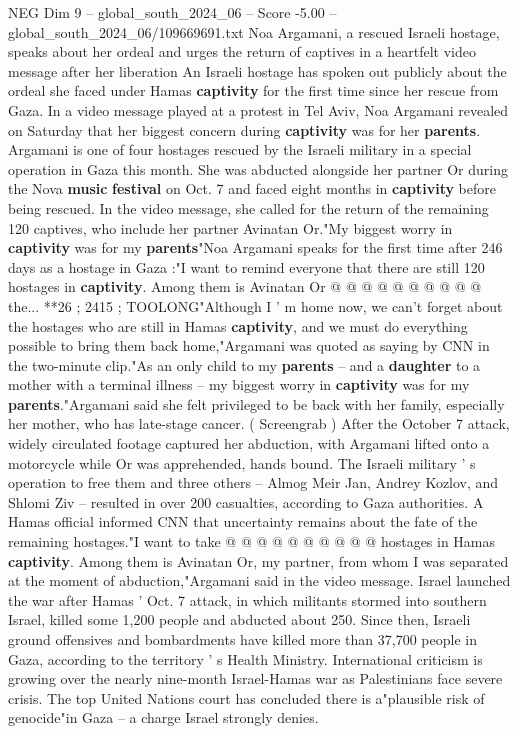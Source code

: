 \begin{textsample}{NEG Dim 9 – global\_south\_2024\_06 – Score -5.00 – global\_south\_2024\_06/109669691.txt}  \label{ex:f9_neg_355}
Noa Argamani, a rescued Israeli hostage, speaks about her ordeal and urges the return of captives in a heartfelt video message after her liberation An Israeli hostage has spoken out publicly about the ordeal she faced under Hamas \textbf{captivity} for the first time since her rescue from Gaza.
In a video message played at a protest in Tel Aviv, Noa Argamani revealed on Saturday that her biggest concern during \textbf{captivity} was for her \textbf{parents}.
Argamani is one of four hostages rescued by the Israeli military in a special operation in Gaza this month.
She was abducted alongside her partner Or during the Nova \textbf{music} \textbf{festival} on Oct. 7 and faced eight months in \textbf{captivity} before being rescued.
In the video message, she called for the return of the remaining 120 captives, who include her partner Avinatan Or."My biggest worry in \textbf{captivity} was for my \textbf{parents}"Noa Argamani speaks for the first time after 246 days as a hostage in Gaza :"I want to remind everyone that there are still 120 hostages in \textbf{captivity}.
Among them is Avinatan Or @ @ @ @ @ @ @ @ @ @ the... **26 ; 2415 ; TOOLONG"Although I ' m home now, we can't forget about the hostages who are still in Hamas \textbf{captivity}, and we must do everything possible to bring them back home,"Argamani was quoted as saying by CNN in the two-minute clip."As an only child to my \textbf{parents} -- and a \textbf{daughter} to a mother with a terminal illness -- my biggest worry in \textbf{captivity} was for my \textbf{parents}."Argamani said she felt privileged to be back with her family, especially her mother, who has late-stage cancer. ( Screengrab ) After the October 7 attack, widely circulated footage captured her abduction, with Argamani lifted onto a motorcycle while Or was apprehended, hands bound.
The Israeli military ' s operation to free them and three others -- Almog Meir Jan, Andrey Kozlov, and Shlomi Ziv -- resulted in over 200 casualties, according to Gaza authorities.
A Hamas official informed CNN that uncertainty remains about the fate of the remaining hostages."I want to take @ @ @ @ @ @ @ @ @ @ hostages in Hamas \textbf{captivity}.
Among them is Avinatan Or, my partner, from whom I was separated at the moment of abduction,"Argamani said in the video message.
Israel launched the war after Hamas ' Oct. 7 attack, in which militants stormed into southern Israel, killed some 1,200 people and abducted about 250.
Since then, Israeli ground offensives and bombardments have killed more than 37,700 people in Gaza, according to the territory ' s Health Ministry.
International criticism is growing over the nearly nine-month Israel-Hamas war as Palestinians face severe crisis.
The top United Nations court has concluded there is a"plausible risk of genocide"in Gaza -- a charge Israel strongly denies.

\end{textsample}
